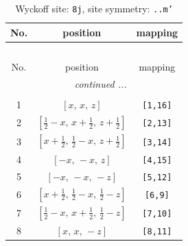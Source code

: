 \documentclass[fleqn,8pt]{jsarticle}
\begin{document}
\begin{longtable}{ccc}
\caption{Wyckoff site: {\tt 8j}, site symmetry: {\tt ..m'}}
 \\
 \hline \hline
No. & position & mapping \\ \hline \endfirsthead

\multicolumn{2}{l}{\tablename\ \thetable{}} \\
 \hline \hline
No. & position & mapping \\ \hline \endhead

 \hline \hline
\multicolumn{2}{r}{\footnotesize\it continued ...} \\ \endfoot

 \hline \hline
\multicolumn{2}{r}{} \\ \endlastfoot

1 & $\left[ x,\, x,\, z \right]$ & {\tt [1,16]} \\ \hline
2 & $\left[ \frac{1}{2} - x,\, x + \frac{1}{2},\, z + \frac{1}{2} \right]$ & {\tt [2,13]} \\ \hline
3 & $\left[ x + \frac{1}{2},\, \frac{1}{2} - x,\, z + \frac{1}{2} \right]$ & {\tt [3,14]} \\ \hline
4 & $\left[ - x,\, - x,\, z \right]$ & {\tt [4,15]} \\ \hline
5 & $\left[ - x,\, - x,\, - z \right]$ & {\tt [5,12]} \\ \hline
6 & $\left[ x + \frac{1}{2},\, \frac{1}{2} - x,\, \frac{1}{2} - z \right]$ & {\tt [6,9]} \\ \hline
7 & $\left[ \frac{1}{2} - x,\, x + \frac{1}{2},\, \frac{1}{2} - z \right]$ & {\tt [7,10]} \\ \hline
8 & $\left[ x,\, x,\, - z \right]$ & {\tt [8,11]} \\
\end{longtable}
\renewcommand{\arraystretch}{1.2}
\end{document}
